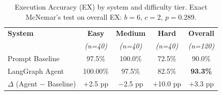 \documentclass[conference]{IEEEtran}
\begin{document}
\begin{table}[t]
\centering
\caption{Execution Accuracy (EX) by system and difficulty tier.
Exact McNemar's test on overall EX: $b{=}6$, $c{=}2$, $p{=}0.289$.}
\label{tab:agent_results}
\begin{tabular}{lcccc}
\toprule
\textbf{System} & \textbf{Easy} & \textbf{Medium} & \textbf{Hard} & \textbf{Overall} \\
                & \textit{(n=40)} & \textit{(n=40)} & \textit{(n=40)} & \textit{(n=120)} \\
\midrule
Prompt Baseline & 97.5\% & 100.0\% & 72.5\% & 90.0\% \\
LangGraph Agent      & 100.00\% & 97.5\% & 82.5\% & \textbf{93.3\%} \\
\midrule
$\Delta$ (Agent $-$ Baseline) & $+$2.5 pp & $-$2.5 pp & $+$10.0 pp & $+$3.3 pp \\
\bottomrule
\end{tabular}
\end{table}
\end{document}
